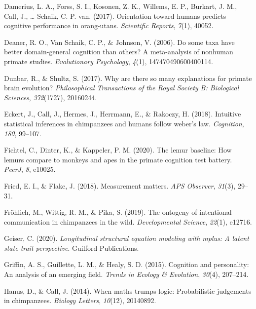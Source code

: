 \documentclass[
  man,floatsintext]{apa6}
\newlength{\cslhangindent}
\newenvironment{CSLReferences}[2] %
 {\begin{list}{}{%
  \setlength{\itemindent}{0pt}
  \setlength{\leftmargin}{0pt}
  \setlength{\parsep}{0pt}
  \ifodd #1
   \setlength{\leftmargin}{\cslhangindent}
   \setlength{\itemindent}{-1\cslhangindent}
  \fi
  \setlength{\itemsep}{#2\baselineskip}}}
 {\end{list}}
\begin{document}
\begin{CSLReferences}{1}{0}
Damerius, L. A., Forss, S. I., Kosonen, Z. K., Willems, E. P., Burkart, J. M., Call, J., \ldots{} Schaik, C. P. van. (2017). Orientation toward humans predicts cognitive performance in orang-utans. \emph{Scientific Reports}, \emph{7}(1), 40052.

Deaner, R. O., Van Schaik, C. P., \& Johnson, V. (2006). Do some taxa have better domain-general cognition than others? A meta-analysis of nonhuman primate studies. \emph{Evolutionary Psychology}, \emph{4}(1), 147470490600400114.

Dunbar, R., \& Shultz, S. (2017). Why are there so many explanations for primate brain evolution? \emph{Philosophical Transactions of the Royal Society B: Biological Sciences}, \emph{372}(1727), 20160244.

Eckert, J., Call, J., Hermes, J., Herrmann, E., \& Rakoczy, H. (2018). Intuitive statistical inferences in chimpanzees and humans follow weber's law. \emph{Cognition}, \emph{180}, 99--107.

Fichtel, C., Dinter, K., \& Kappeler, P. M. (2020). The lemur baseline: How lemurs compare to monkeys and apes in the primate cognition test battery. \emph{PeerJ}, \emph{8}, e10025.

Fried, E. I., \& Flake, J. (2018). Measurement matters. \emph{APS Observer}, \emph{31}(3), 29--31.

Fröhlich, M., Wittig, R. M., \& Pika, S. (2019). The ontogeny of intentional communication in chimpanzees in the wild. \emph{Developmental Science}, \emph{22}(1), e12716.

Geiser, C. (2020). \emph{Longitudinal structural equation modeling with mplus: A latent state-trait perspective}. Guilford Publications.

Griffin, A. S., Guillette, L. M., \& Healy, S. D. (2015). Cognition and personality: An analysis of an emerging field. \emph{Trends in Ecology \& Evolution}, \emph{30}(4), 207--214.

Hanus, D., \& Call, J. (2014). When maths trumps logic: Probabilistic judgements in chimpanzees. \emph{Biology Letters}, \emph{10}(12), 20140892.


\end{CSLReferences}
\end{document}
